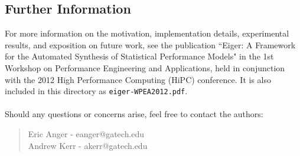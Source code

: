 \subsection{Further Information}
For more information on the motivation, implementation details, 
experimental results, and exposition on future work, see the 
publication ``Eiger: A Framework for the Automated Synthesis of 
Statistical Performance Models" in the 1st Workshop on Performance 
Engineering and Applications, held in conjunction with the 2012 High 
Performance Computing (HiPC) conference. It is also included in 
this directory as \texttt{eiger-WPEA2012.pdf}.\\ \\
Should any questions or concerns arise, feel free to contact the
authors:
	\begin{quote}
	\centering
	Eric Anger	-	eanger@gatech.edu\\
	Andrew Kerr	-	akerr@gatech.edu
	\end{quote}
